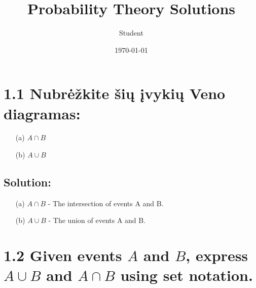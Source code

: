 \documentclass{article}
\title{Probability Theory Solutions}
\author{Student}
\date{\today}
\begin{document}
\maketitle

\section*{1.1 Nubrėžkite šių įvykių Veno diagramas:}
\begin{itemize}
    \item[(a)] \( A \cap B \)
    \item[(b)] \( A \cup B \)
\end{itemize}

\subsection*{Solution:}
\begin{itemize}
    \item[(a)] \( A \cap B \) - The intersection of events A and B.
    \begin{center}
    \end{center}
    
    \item[(b)] \( A \cup B \) - The union of events A and B.
    \begin{center}
    \end{center}
\end{itemize}

\section*{1.2 Given events \(A\) and \(B\), express \(A \cup B\) and \(A \cap B\) using set notation.}
\end{document}
